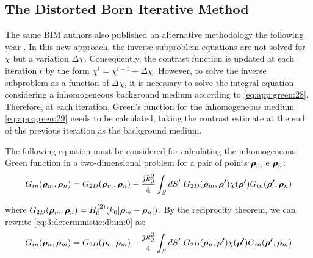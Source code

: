 		\subsection{The Distorted Born Iterative Method}\label{chap:methods:deterministic:dbim}
				
			The same BIM authors also published an alternative methodology the following year \citep{chew1990reconstruction}. In this new approach, the inverse subproblem equations are not solved for $\chi$ but a variation $\Delta\chi$. Consequently, the contrast function is updated at each iteration $t$ by the form $\chi^t = \chi^{t-1} + \Delta\chi$. However, to solve the inverse subproblem as a function of $\Delta\chi$, it is necessary to solve the integral equation considering a inhomogeneous background medium according to \eqref{eq:app:green:28}. Therefore, at each iteration, Green's function for the inhomogeneous medium \eqref{eq:app:green:29} needs to be calculated, taking the contrast estimate at the end of the previous iteration as the background medium.
					
			The following equation must be considered for calculating the inhomogeneous Green function in a two-dimensional problem for a pair of points $\boldsymbol{\rho}_{m}$ e $\boldsymbol{\rho}_{n}$:
			\begin{equation}
				G_{in}(\boldsymbol{\rho}_{m},\boldsymbol{\rho}_{n}) = G_{2D}(\boldsymbol{\rho}_{m},\boldsymbol{\rho}_{n}) - \frac{jk_0^2}{4} \int_{S}dS^{\prime}~ G_{2D}(\boldsymbol{\rho}_m,\boldsymbol{\rho^\prime})\chi(\boldsymbol{\rho^\prime})G_{in}(\boldsymbol{\rho^\prime},\boldsymbol{\rho}_n) \label{eq:3:deterministic:dbim:0}
			\end{equation}
				
			\noindent where $G_{2D}(\boldsymbol{\rho}_{m},\boldsymbol{\rho}_{n})=H^{(2)}_0(k_0|\boldsymbol{\rho}_m-\boldsymbol{\rho}_n|)$. By the reciprocity theorem, we can rewrite \eqref{eq:3:deterministic:dbim:0} as:
			\begin{equation}
				G_{in}(\boldsymbol{\rho}_{n},\boldsymbol{\rho}_{m}) = G_{2D}(\boldsymbol{\rho}_{n},\boldsymbol{\rho}_{m}) - \frac{jk_0^2}{4} \int_{S}dS^{\prime}~ G_{2D}(\boldsymbol{\rho}_n,\boldsymbol{\rho^\prime})\chi(\boldsymbol{\rho^\prime})G_{in}(\boldsymbol{\rho^\prime},\boldsymbol{\rho}_m) \label{eq:3:deterministic:dbim:1}
			\end{equation}
		
